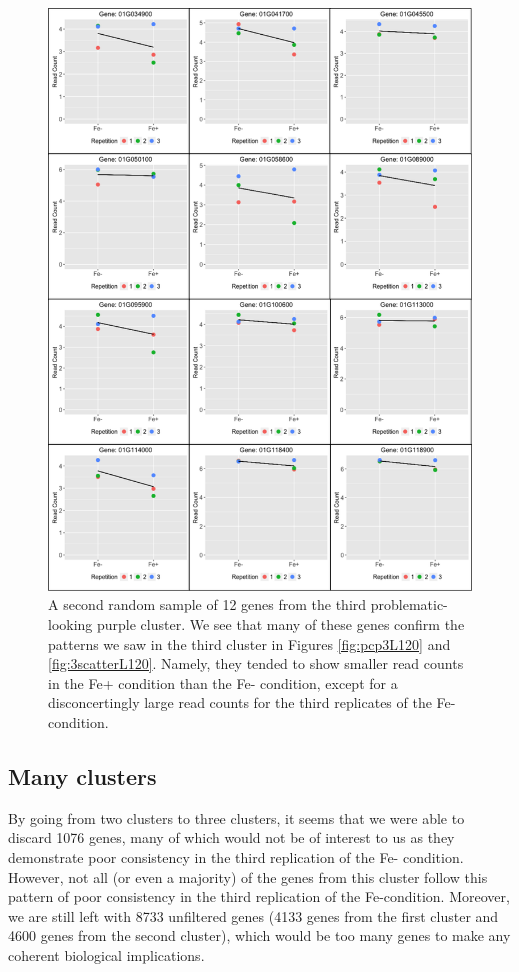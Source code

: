 \documentclass[11pt,a4paper,oldfontcommands,openany]{memoir}
\numberwithin{equation}{section} %
\begin{document}
\begin{figure}[H]
  \centering
  \includegraphics[width=\textwidth]{indSBGenes2}
  \caption{A second random sample of 12 genes from the third problematic-looking purple cluster. We see that many of these genes confirm the patterns we saw in the third cluster in Figures \ref{fig:pcp3L120} and \ref{fig:3scatterL120}. Namely, they tended to show smaller read counts in the Fe+ condition than the Fe- condition, except for a disconcertingly large read counts for the third replicates of the Fe- condition.}
  \label{fig:indSBGenes2}
\end{figure}

\subsection{Many clusters}
\label{sec:manyClusters}

By going from two clusters to three clusters, it seems that we were able to discard 1076 genes, many of which would not be of interest to us as they demonstrate poor consistency in the third replication of the Fe- condition. However, not all (or even a majority) of the genes from this cluster follow this pattern of poor consistency in the third replication of the Fe-condition. Moreover, we are still left with 8733 unfiltered genes (4133 genes from the first cluster and 4600 genes from the second cluster), which would be too many genes to make any coherent biological implications.  
\end{document}
